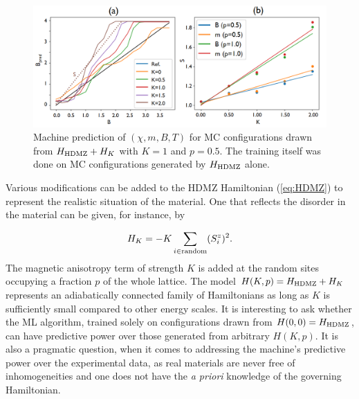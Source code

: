 \documentclass[reprint,amsmath,amssymb,aps,showpacs,superscriptaddress,prl]{revtex4-1}
\newcommand{\ba}{\begin{eqnarray}}
\newcommand{\ea}{\end{eqnarray}}
\begin{document}
\begin{figure}[h]
\includegraphics[scale=0.6]{fig4.png}
\caption{Machine prediction of $(\chi, m, B, T)$ for MC configurations drawn from $H_{\rm HDMZ} + H_K$ with $K=1$ and $p=0.5$.  The training itself was done on MC configurations generated by $H_{\rm HDMZ}$ alone.}\label{fig:3}
\end{figure}


Various modifications can be added to the HDMZ Hamiltonian (\ref{eq:HDMZ}) to represent the realistic situation of the material. One that reflects the disorder in the material can be given, for instance, by~\cite{skyrmion-book,jiang-review,fert-review}

\ba H_{K} = -K \sum_{i \in {\rm random}} (S^z_i )^2 . \ea
The magnetic anisotropy term of strength $K$ is added at the random sites occupying a fraction $p$ of the whole lattice. The model $H(K,p) = H_{\rm HDMZ} + H_K$ represents an adiabatically connected family of Hamiltonians as long as $K$ is sufficiently small compared to other energy scales. It is interesting to ask whether the ML algorithm, trained solely on  configurations drawn from $H(0,0)= H_{\rm HDMZ}$, can have predictive power over those generated from arbitrary $H(K,p)$. It is also a pragmatic question, when it comes to addressing the machine's predictive power over the experimental data, as real materials are never free of inhomogeneities and one does not have the {\it a priori} knowledge of the governing Hamiltonian.

\end{document}

